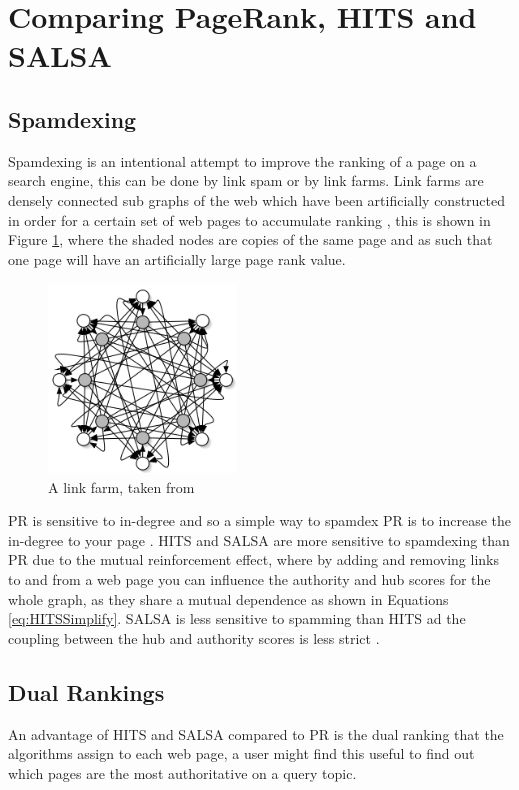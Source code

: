 \documentclass[11pt]{report}
\begin{document}
{\section{Comparing PageRank, HITS and SALSA} \label{sec:compare}
\subsection{Spamdexing}
Spamdexing is an intentional attempt to improve the ranking of a page on a search engine, this can be done by link spam or by link farms. Link farms are densely connected sub graphs of the web which have been artificially constructed in order for a certain set of web pages to accumulate ranking \cite{baldi2003modeling}, this is shown in Figure \ref{fig:link farm}, where the shaded nodes are copies of the same page and as such that one page will have an artificially large page rank value. 

\begin{figure}[h!]
\centering
\includegraphics[width=5cm]{link_farm_baldi.png}
\caption{A link farm, taken from \cite{baldi2003modeling}}
\label{fig:link farm}
\end{figure}

PR is sensitive to in-degree and so a simple way to spamdex PR is to increase the in-degree to your page \cite{bonato}. HITS and SALSA are more sensitive to spamdexing than PR due to the mutual reinforcement effect, where by adding and removing links to and from a web page you can influence the authority and hub scores for the whole graph, as they share a mutual dependence as shown in Equations \eqref{eq:HITSSimplify}. SALSA is less sensitive to spamming than HITS ad the coupling between the hub and authority scores is less strict \cite{lempel2000stochastic}. 

\subsection{Dual Rankings}
An advantage of HITS and SALSA compared to PR is the dual ranking that the algorithms assign to each web page, a user might find this useful to find out which pages are the most authoritative on a query topic.

}
\end{document}
